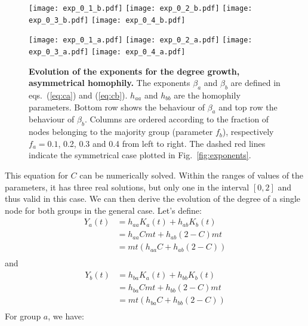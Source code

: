 \begin{figure*}[]
\centering
\texttt{[image: exp\_0\_1\_b.pdf]}
\texttt{[image: exp\_0\_2\_b.pdf]}
\texttt{[image: exp\_0\_3\_b.pdf]}
\texttt{[image: exp\_0\_4\_b.pdf]}

\texttt{[image: exp\_0\_1\_a.pdf]}
\texttt{[image: exp\_0\_2\_a.pdf]}
\texttt{[image: exp\_0\_3\_a.pdf]}
\texttt{[image: exp\_0\_4\_a.pdf]}
\caption{\textbf{Evolution of the exponents for the degree growth, asymmetrical homophily.} The exponents $\beta_a$ and $\beta_b$ are defined in eqs.~(\ref{eq:ca}) and (\ref{eq:cb}). $h_{aa}$ and $h_{bb}$ are the homophily parameters. Bottom row shows the behaviour of $\beta_a$ and top row the behaviour of $\beta_b$. Columns are ordered according to the fraction of nodes belonging to the majority group (parameter $f_b$), respectively $f_a = 0.1$, 0.2, 0.3 and 0.4 from left to right. The dashed red lines indicate the symmetrical case plotted in Fig.~\ref{fig:exponents}.}
\label{fig:exponents_asym}
\end{figure*}


This equation for $C$ can be numerically solved. Within the ranges of values of the parameters, it has three real solutions, but only one in the interval $[0,2]$ and thus valid in this case. We can then derive the evolution of the degree of a single node for both groups in the general case. Let's define:
\small
\begin{equation}
\begin{split}
  Y_a(t) &= h_{aa}K_a(t) + h_{ab}K_b(t)\\
  &= h_{aa}Cmt + h_{ab}(2-C)mt\\
  &= mt(h_{aa}C + h_{ab}(2-C))\\
\end{split}
\end{equation}
and
\begin{equation}
\begin{split}
  Y_b(t) &= h_{ba}K_a(t) + h_{bb}K_b(t)\\
  &= h_{ba}Cmt + h_{bb}(2-C)mt\\
  &= mt(h_{ba}C + h_{bb}(2-C))\\
\end{split}
\end{equation}
\normalsize
For group $a$, we have:

